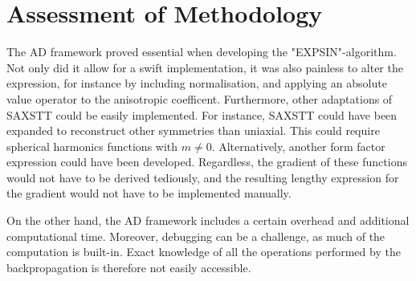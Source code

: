 \section{Assessment of Methodology}
\noindent
The AD framework proved essential when developing the "EXPSIN"-algorithm. Not only did it allow for a swift implementation,
it was also painless to alter the expression, for instance by including normalisation, and applying an absolute value operator to the anisotropic coefficent.
Furthermore, other adaptations of SAXSTT could be easily implemented. For instance, SAXSTT could have been expanded to reconstruct other symmetries than uniaxial.
This could require spherical harmonics functions with $m \neq 0$. Alternatively, another form factor expression could have been developed.
Regardless, the gradient of these functions would not have to be derived tediously, and the resulting lengthy expression for the gradient would not have to be implemented manually.

On the other hand, the AD framework includes a certain overhead and additional computational time. Moreover, debugging can be a challenge, as much of the computation is built-in.
Exact knowledge of all the operations performed by the backpropagation is therefore not easily accessible.


